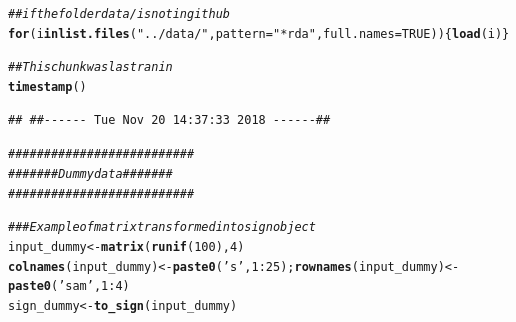 \documentclass{article}\usepackage[]{graphicx}\usepackage[]{color}
\makeatletter
\newcommand{\hlnum}[1]{\textcolor[rgb]{0.686,0.059,0.569}{#1}}%
\newcommand{\hlstr}[1]{\textcolor[rgb]{0.192,0.494,0.8}{#1}}%
\newcommand{\hlcom}[1]{\textcolor[rgb]{0.678,0.584,0.686}{\textit{#1}}}%
\newcommand{\hlopt}[1]{\textcolor[rgb]{0,0,0}{#1}}%
\newcommand{\hlstd}[1]{\textcolor[rgb]{0.345,0.345,0.345}{#1}}%
\newcommand{\hlkwa}[1]{\textcolor[rgb]{0.161,0.373,0.58}{\textbf{#1}}}%
\newcommand{\hlkwb}[1]{\textcolor[rgb]{0.69,0.353,0.396}{#1}}%
\newcommand{\hlkwc}[1]{\textcolor[rgb]{0.333,0.667,0.333}{#1}}%
\newcommand{\hlkwd}[1]{\textcolor[rgb]{0.737,0.353,0.396}{\textbf{#1}}}%
\newenvironment{kframe}{%
 \def\at@end@of@kframe{}%
 \ifinner\ifhmode%
  \def\at@end@of@kframe{\end{minipage}}%
  \begin{minipage}{\columnwidth}%
 \fi\fi%
 \def\FrameCommand##1{\hskip\@totalleftmargin \hskip-\fboxsep
 \colorbox{shadecolor}{##1}\hskip-\fboxsep
     \hskip-\linewidth \hskip-\@totalleftmargin \hskip\columnwidth}%
 \MakeFramed {\advance\hsize-\width
   \@totalleftmargin\z@ \linewidth\hsize
   \@setminipage}}%
 {\par\unskip\endMakeFramed%
 \at@end@of@kframe}
\newenvironment{knitrout}{}{} %
\makeatother
\begin{document}
\begin{knitrout}
\color{fgcolor}\begin{kframe}
\begin{alltt}
\hlcom{## if the folder data/ is not in github}
\hlkwa{for}\hlstd{(i} \hlkwa{in} \hlkwd{list.files}\hlstd{(}\hlstr{"../data/"}\hlstd{,} \hlkwc{pattern} \hlstd{=} \hlstr{"*rda"}\hlstd{,} \hlkwc{full.names} \hlstd{=} \hlnum{TRUE}\hlstd{))\{}\hlkwd{load}\hlstd{(i)\}}
\end{alltt}
\end{kframe}
\end{knitrout}

\begin{knitrout}
\color{fgcolor}\begin{kframe}
\begin{alltt}
\hlcom{## This chunk was last ran in}
\hlkwd{timestamp}\hlstd{()}
\end{alltt}
\begin{verbatim}
## ##------ Tue Nov 20 14:37:33 2018 ------##
\end{verbatim}
\begin{alltt}
\hlcom{##########################}
\hlcom{####### Dummy data #######}
\hlcom{##########################}

\hlcom{### Example of matrix transformed into sign object}
\hlstd{input_dummy} \hlkwb{<-} \hlkwd{matrix}\hlstd{(}\hlkwd{runif}\hlstd{(}\hlnum{100}\hlstd{),} \hlnum{4}\hlstd{)}
\hlkwd{colnames}\hlstd{(input_dummy)} \hlkwb{<-} \hlkwd{paste0}\hlstd{(}\hlstr{'s'}\hlstd{,} \hlnum{1}\hlopt{:}\hlnum{25}\hlstd{);} \hlkwd{rownames}\hlstd{(input_dummy)} \hlkwb{<-} \hlkwd{paste0}\hlstd{(}\hlstr{'sam'}\hlstd{,} \hlnum{1}\hlopt{:}\hlnum{4}\hlstd{)}
\hlstd{sign_dummy} \hlkwb{<-} \hlkwd{to_sign}\hlstd{(input_dummy)}
\end{alltt}
\end{kframe}
\end{knitrout}
\end{document}
